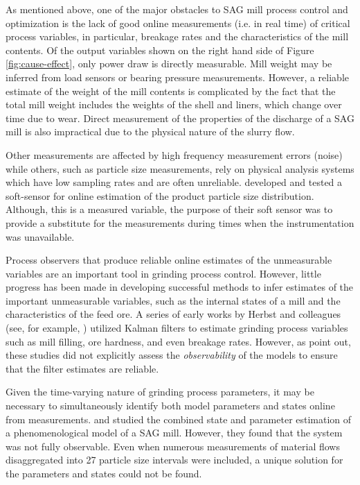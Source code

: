 As mentioned above, one of the major obstacles to \gls{SAG} mill process control and optimization is the lack of good online measurements (i.e. in real time) of critical process variables, in particular, breakage rates and the characteristics of the mill contents. Of the output variables shown on the right hand side of Figure \ref{fig:cause-effect}, only power draw is directly measurable. Mill weight may be inferred from load sensors or bearing pressure measurements. However, a reliable estimate of the weight of the mill contents is complicated by the fact that the total mill weight includes the weights of the shell and liners, which change over time due to wear. Direct measurement of the properties of the discharge of a \gls{SAG} mill is also impractical due to the physical nature of the slurry flow.

Other measurements are affected by high frequency measurement errors (noise) while others, such as particle size measurements, rely on physical analysis systems which have low sampling rates and are often unreliable. \cite{casali_particle_1998} developed and tested a soft-sensor for online estimation of the product particle size distribution. Although, this is a measured variable, the purpose of their soft sensor was to provide a substitute for the measurements during times when the instrumentation was unavailable.

Process observers that produce reliable online estimates of the unmeasurable variables are an important tool in grinding process control. However, little progress has been made in developing successful methods to infer estimates of the important unmeasurable variables, such as the internal states of a mill and the characteristics of the feed ore. A series of early works by Herbst and colleagues (see, for example, \cite{herbst_model-based_1992}) utilized Kalman filters to estimate grinding process variables such as mill filling, ore hardness, and even breakage rates. However, as \cite{le_roux_ekf_2017} point out, these studies did not explicitly assess the \textit{observability} of the models to ensure that the filter estimates are reliable.

Given the time-varying nature of grinding process parameters, it may be necessary to simultaneously identify both model parameters and states online from measurements. \cite{apelt_inferential_2002} and \cite{apelt_inferential_2002-1} studied the combined state and parameter estimation of a phenomenological model of a \gls{SAG} mill. However, they found that the system was not fully observable. Even when numerous measurements of material flows disaggregated into 27 particle size intervals were included, a unique solution for the parameters and states could not be found.

